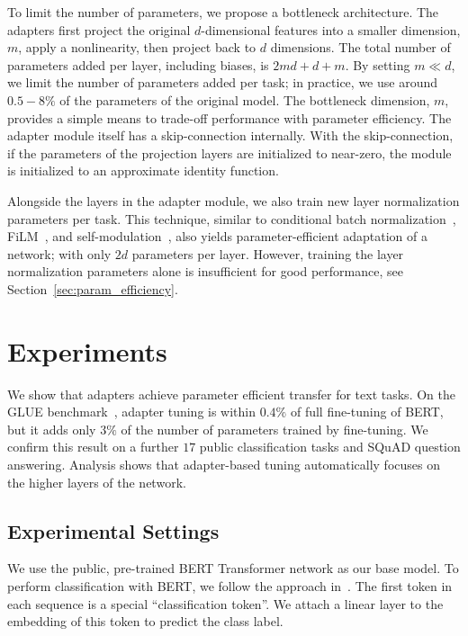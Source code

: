 To limit the number of parameters, we propose a bottleneck architecture. The adapters first project the original $d$-dimensional features into a smaller dimension, $m$, apply a nonlinearity, then project back to $d$ dimensions. The total number of parameters added per layer, including biases, is $2md+d+m$. By setting $m\ll d$, we limit the number of parameters added per task; in practice, we use around $0.5-8\%$ of the parameters of the original model. The bottleneck dimension, $m$, provides a simple means to trade-off performance with parameter efficiency. The adapter module itself has a skip-connection internally. With the skip-connection, if the parameters of the projection layers are initialized to near-zero, the module is initialized to an approximate identity function.

Alongside the layers in the adapter module, we also train new layer normalization parameters per task. This technique, similar to conditional batch normalization~\citep{de2017modulating}, FiLM~\citep{perez2018}, and self-modulation~\citep{chen2019}, also yields parameter-efficient adaptation of a network; with only $2d$ parameters per layer. However, training the layer normalization parameters alone is insufficient for good performance, see Section~\ref{sec:param_efficiency}.

\section{Experiments\label{sec:experiments}}

We show that adapters achieve parameter efficient transfer for text tasks. On the GLUE benchmark~\citep{wang2018glue}, adapter tuning is within $0.4\%$ of full fine-tuning of BERT, but it adds only $3\%$ of the number of parameters trained by fine-tuning. We confirm this result on a further $17$ public classification tasks and SQuAD question answering. Analysis shows that adapter-based tuning automatically focuses on the higher layers of the network.

\subsection{Experimental Settings}

We use the public, pre-trained BERT Transformer network as our base model. To perform classification with BERT, we follow the approach in~\citet{devlin2018bert}.
The first token in each sequence is a special ``classification token''. We attach a linear layer to the embedding of this token to predict the class label.

